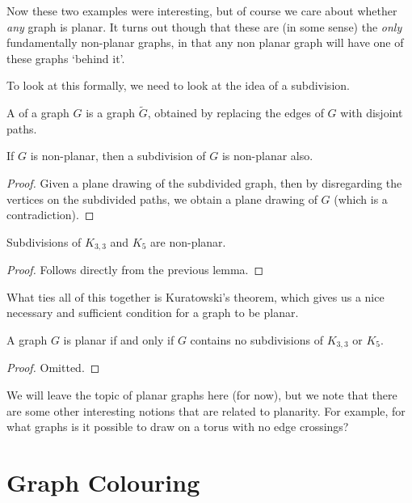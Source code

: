\documentclass[a4paper]{scrartcl}
\begin{document}
Now these two examples were interesting, but of course we care about whether \emph{any} graph is planar.  It turns out though that these are (in some sense) the \emph{only} fundamentally non-planar graphs, in that any non planar graph will have one of these graphs `behind it'.

To look at this formally, we need to look at the idea of a subdivision.

\begin{definition}[Subdivision]
	A  of a graph $G$ is a graph $\tilde{G}$, obtained by replacing the edges of $G$ with disjoint paths.
\end{definition}

\begin{lemma}
	If $G$ is non-planar, then a subdivision of $G$ is non-planar also.
\end{lemma}
\begin{proof}
	Given a plane drawing of the subdivided graph, then by disregarding the vertices on the subdivided paths, we obtain a plane drawing of $G$ (which is a contradiction).
\end{proof}

\begin{corollary}\label{cor:planar}
	Subdivisions of $K_{3, 3}$ and $K_5$ are non-planar.
\end{corollary}
\begin{proof}
	Follows directly from the previous lemma.
\end{proof}

What ties all of this together is Kuratowski's theorem, which gives us a nice necessary and sufficient condition for a graph to be planar.

\begin{theorem}
	A graph $G$ is planar if and only if $G$ contains no subdivisions of $K_{3, 3}$ or $K_5$.
\end{theorem}
\begin{proof}
	Omitted.\let\qed\relax
\end{proof}

We will leave the topic of planar graphs here (for now), but we note that there are some other interesting notions that are related to planarity. For example, for what graphs is it possible to draw on a torus with no edge crossings?

\section{Graph Colouring}
\end{document}
